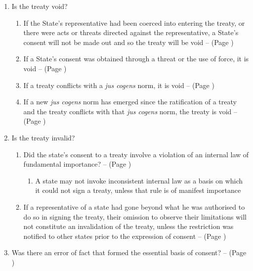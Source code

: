 \begin{enumerate}
\begin{enumerate}
        \item Is the treaty void?
        \begin{enumerate}
            \item If the State's representative had been coerced into entering the treaty, or there were acts or threats directed against the representative, a State's consent will not be made out and so the treaty will be void --  (Page \pageref{VCLT Art 51})
            \item If a State's consent was obtained through a threat or the use of force, it is void --  (Page \pageref{VCLT Art 52})
            \item If a treaty conflicts with a \textit{jus cogens} norm, it is void --  (Page \pageref{VCLT Art 53})
            \item If a new \textit{jus cogens} norm has emerged since the ratification of a treaty and the treaty conflicts with that \textit{jus cogens} norm, the treaty is void --  (Page \pageref{VCLT Art 64})
        \end{enumerate}
        \item Is the treaty invalid?
        \begin{enumerate}
            \item Did the state's consent to a treaty involve a violation of an internal law of fundamental importance? --  (Page \pageref{VCLT Art 46})
            \begin{enumerate}
                \item A state may not invoke inconsistent internal law as a basis on which it could not sign a treaty, unless that rule is of manifest importance
            \end{enumerate}
            \item If a representative of a state had gone beyond what he was authorised to do so in signing the treaty, their omission to observe their limitations will not constitute an invalidation of the treaty, unless the restriction was notified to other states prior to the expression of consent --  (Page \pageref{VCLT Art 47})
        \end{enumerate}
        \item Was there an error of fact that formed the essential basis of consent? --  (Page \pageref{VCLT Art 48})
        \begin{enumerate}

\end{enumerate}
\end{enumerate}
\end{enumerate}
